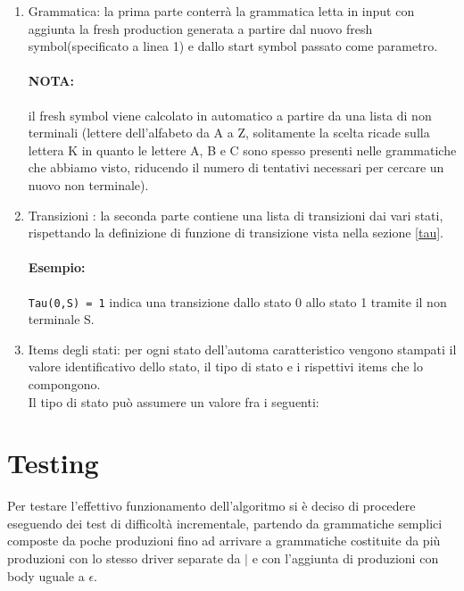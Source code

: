 \documentclass[12pt]{article}
\begin{document}
\begin{enumerate}
\item Grammatica: la prima parte conterrà la grammatica letta in input con aggiunta la fresh production generata a partire dal nuovo fresh symbol(specificato a linea 1) e dallo start symbol passato come parametro.

\paragraph{NOTA:}il fresh symbol viene calcolato in automatico a partire da una lista di non terminali (lettere dell'alfabeto da A a Z, solitamente la scelta ricade sulla lettera K in quanto le lettere A, B e C sono spesso presenti nelle grammatiche che abbiamo visto, riducendo il numero di tentativi necessari per cercare un nuovo non terminale).

\item Transizioni : la seconda parte contiene una lista di transizioni dai vari stati, rispettando la definizione di funzione di transizione vista nella sezione \ref{tau}.
\paragraph{Esempio: } \texttt{Tau(0,S) = 1} indica una transizione dallo stato 0 allo stato 1 tramite il non terminale S.

\item Items degli stati: per ogni stato dell'automa caratteristico vengono stampati il valore identificativo dello stato, il tipo di stato e i rispettivi items che lo compongono. \\

Il tipo di stato può assumere un valore fra i seguenti:

\end{enumerate}


\section{Testing}
Per testare l'effettivo funzionamento dell'algoritmo si è deciso di procedere eseguendo dei test di difficoltà incrementale, partendo da grammatiche semplici composte da poche produzioni fino ad arrivare a grammatiche costituite da più produzioni con lo stesso driver separate da $\mid$ e con l'aggiunta di produzioni con body uguale a $\epsilon$.\\
\end{document}
